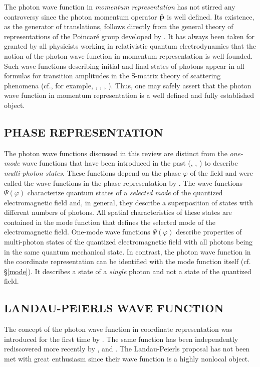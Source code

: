 \documentclass[11pt]{article}
\begin{document}
The photon wave function in {\em momentum representation} has not stirred
any controversy since the photon momentum operator $\hat{\bf p}$ is well defined. Its
existence, as the generator of translations, follows directly from the
general theory of representations of the Poincar\'e group developed by
\cite{Wigner_39}. It has always been taken for granted by all physicists
working in relativistic quantum electrodynamics that the notion of the
photon wave function in momentum representation is well founded. Such wave
functions describing initial and final states of photons appear in all
formulas for transition amplitudes in the S-matrix theory of scattering
phenomena (cf., for example, \cite{Schweber_61}, \cite{AB_65},
\cite{BBBB_75}, \cite{CDG_89}). Thus, one may safely assert that the photon
wave function in momentum representation is a well defined and fully
established object.

\subsection{PHASE REPRESENTATION}

The photon wave functions discussed in this review are distinct from the
{\em one-mode} wave functions that have been introduced in the past
(\cite{London_27}, \cite{BBBB_76}, \cite{PB_88}) to describe {\em multi-photon
states}. These functions depend on the phase $\varphi$ of the field and were
called the wave functions in the phase representation by \cite{BBBB_76}. The
wave functions $\Psi(\varphi)$ characterize quantum states of a {\em
selected mode} of the quantized electromagnetic field and, in general, they
describe a superposition of states with different numbers of photons. All
spatial characteristics of these states are contained in the mode function
that defines the selected mode of the electromagnetic field. One-mode wave
functions $\Psi(\varphi)$ describe properties of multi-photon states of the
quantized electromagnetic field with all photons being in the same quantum mechanical state. In contrast, the photon wave function in the coordinate representation can be
identified with the mode function itself (cf. \S \ref{mode}). It describes a
state of a {\em single} photon and not a state of the quantized field.

\subsection{LANDAU-PEIERLS WAVE FUNCTION}

The concept of the photon wave function in coordinate representation was
introduced for the first time by \cite{LP_30}. The same function has been
independently rediscovered more recently by \cite{Cook_82a, Cook_82b}, and
\cite{Inagaki_94}. The Landau-Peierls proposal has not been met with great
enthusiasm since their wave function is a highly nonlocal object.
\end{document}
